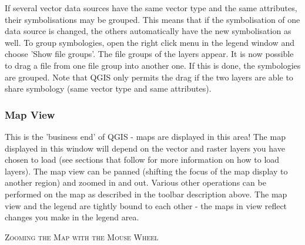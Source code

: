 If several vector data sources have the same vector type and the same attributes, their 
symbolisations may be grouped. This means that if the symbolisation of one data source is 
changed, the others automatically have the new symbolisation as well. To group symbologies, open 
the right click menu in the legend window and choose 'Show file groups'. The file groups of the 
layers appear. It is now possible to drag a file from one file group into another one. If this is done, 
the symbologies are grouped. Note that QGIS only permits the drag if the two layers are able to share 
symbology (same vector type and same attributes).  

%

\subsubsection{Map View}\label{label_mapview}

This is the 'business end' of QGIS - maps are displayed in this area! The
map displayed in this window will depend on the vector and raster layers you
have chosen to load (see sections that follow for more information on how to
load layers). The map view can be panned (shifting the focus of the map display
to another region) and zoomed in and out. Various other operations can be
performed on the map as described in the toolbar description above.  The map
view and the legend are tightly bound to each other - the maps in view reflect
changes you make in the legend area.  

\begin{Tip}\caption{\textsc{Zooming the Map with the Mouse
Wheel}}
\end{Tip}

